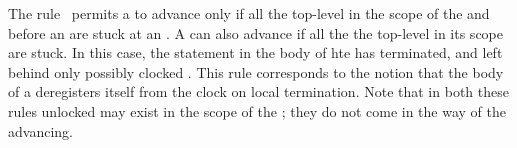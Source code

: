 The rule~ permits a  to advance
only if all the top-level  in the scope of the
 and before an  are stuck at an
. A  can also advance if all the
the top-level  in its scope are stuck. In this
case, the statement in the body of hte  has
terminated, and left behind only possibly clocked . This
rule corresponds to the notion that the body of a  deregisters itself from the clock on local termination.
Note that in both these rules unlocked  may exist in the
scope of the ; they do not come in the way of the
 advancing.

\begin{figure*}[t]
\begin{center}
\end{center}
\end{figure*}
